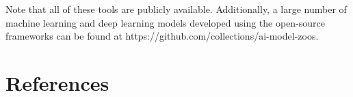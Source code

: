Note that all of these tools are publicly available. Additionally, a large number of machine learning and deep learning models developed using the open-source frameworks can be found at https://github.com/collections/ai-model-zoos.

\section{References}

%
%
%
%
%
%
%
%
%
%
%
